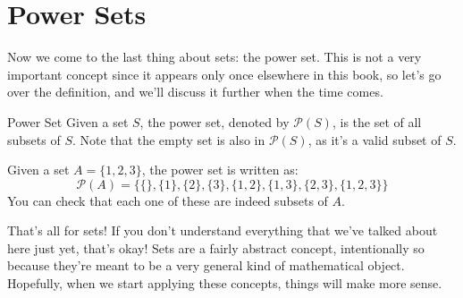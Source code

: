  
 


\section{Power Sets}
Now we come to the last thing about sets: the power set. This is not a very important concept since it appears 
only once elsewhere in this book, so let's go over the definition, and we'll discuss it further when the time 
comes.
\begin{definition}{Power Set}{}
	Given a set \( S \), the power set, denoted by \( \mathcal P(S) \), is the set of all subsets of \( S \). Note that 
	the empty set is also in \( \mathcal P(S) \), as it's a valid subset of \( S \). 
\end{definition}
\begin{example}{}{}
	Given a set \( A = \{1, 2, 3\}  \), the power set is written as:
	\[
		\mathcal P(A) = \{ \{\} , \{1\} , \{2\} , \{3\} , \{1, 2\} , \{1, 3\} , \{2, 3\} , \{1, 2, 3\} \} 
	\] 
	You can check that each one of these are indeed subsets of \( A \).  
\end{example}
That's all for sets! If you don't understand everything that we've talked about here just yet, that's okay! Sets are
a fairly abstract concept, intentionally so because they're meant to be a very general kind of mathematical object. 
Hopefully, when we start applying these concepts, things will make more sense.
